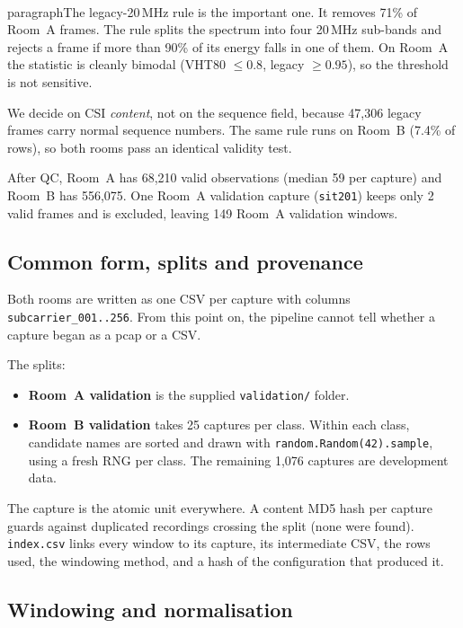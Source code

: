 \documentclass[11pt,a4paper]{article}
\begin{document}
\\paragraph{The legacy-20\,MHz rule is the important one.} It removes 71\% of Room~A frames. The rule splits the spectrum into four 20\,MHz sub-bands and rejects a frame if more than 90\% of its energy falls in one of them. On Room~A the statistic is cleanly bimodal (VHT80 $\le0.8$, legacy $\ge0.95$), so the threshold is not sensitive.

We decide on CSI \emph{content}, not on the sequence field, because 47{,}306 legacy frames carry normal sequence numbers. The same rule runs on Room~B (7.4\% of rows), so both rooms pass an identical validity test.

After QC, Room~A has 68{,}210 valid observations (median 59 per capture) and Room~B has 556{,}075. One Room~A validation capture (\texttt{sit201}) keeps only 2 valid frames and is excluded, leaving 149 Room~A validation windows.

\subsection{Common form, splits and provenance}
Both rooms are written as one CSV per capture with columns \texttt{subcarrier\_001..256}. From this point on, the pipeline cannot tell whether a capture began as a pcap or a CSV.

The splits:
\begin{itemize}
  \item \textbf{Room~A validation} is the supplied \texttt{validation/} folder.
  \item \textbf{Room~B validation} takes 25 captures per class. Within each class, candidate names are sorted and drawn with \texttt{random.Random(42).sample}, using a fresh RNG per class. The remaining 1{,}076 captures are development data.
\end{itemize}

The capture is the atomic unit everywhere. A content MD5 hash per capture guards against duplicated recordings crossing the split (none were found). \texttt{index.csv} links every window to its capture, its intermediate CSV, the rows used, the windowing method, and a hash of the configuration that produced it.

\subsection{Windowing and normalisation}
\end{document}
